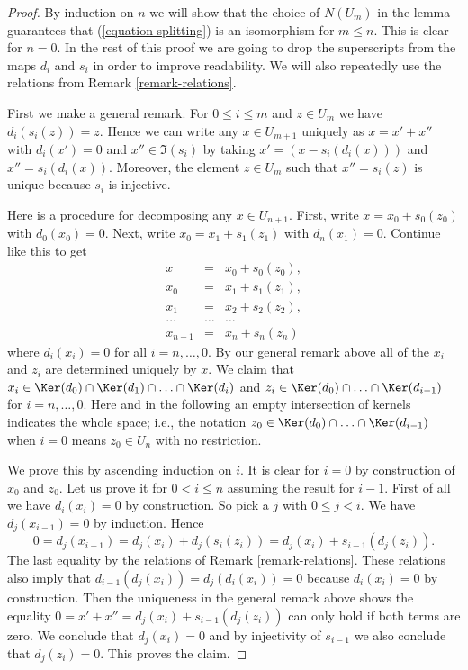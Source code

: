 \begin{proof}
By induction on $n$ we will show that the choice of $N(U_m)$
in the lemma guarantees that (\ref{equation-splitting}) is
an isomorphism for $m \leq n$. This is clear for $n = 0$.
In the rest of this proof we are going to
drop the superscripts from the maps $d_i$ and $s_i$ in order
to improve readability. We will also repeatedly use the relations
from Remark \ref{remark-relations}.

\medskip\noindent
First we make a general remark.
For $0 \leq i \leq m$ and $z \in U_m$ we have
$d_i(s_i(z)) = z$. Hence we can write
any $x \in U_{m + 1}$ uniquely as
$x = x' + x''$ with $d_i(x') = 0$
and $x'' \in \Im(s_i)$
by taking $x' = (x - s_i(d_i(x)))$ and
$x'' = s_i(d_i(x))$. Moreover, the element
$z \in U_m$ such that $x'' = s_i(z)$
is unique because $s_i$ is injective.

\medskip\noindent
Here is a procedure for decomposing
any $x \in U_{n + 1}$.
First, write $x = x_0 + s_0(z_0)$ with $d_0(x_0) = 0$.
Next, write $x_0 = x_1 + s_1(z_1)$ with
$d_n(x_1) = 0$. Continue like this to get
\begin{eqnarray*}
x & = & x_0 + s_0(z_0), \\
x_0 & = & x_1 + s_1(z_1), \\
x_1 & = & x_2 + s_2(z_2), \\
\ldots & \ldots & \ldots \\
x_{n - 1} & = & x_n + s_n(z_n)
\end{eqnarray*}
where $d_i(x_i) = 0$ for all $i = n, \ldots, 0$.
By our general remark above all of the $x_i$
and $z_i$ are determined uniquely by $x$.
We claim that
$x_i \in
\Ker(d_0) \cap
\Ker(d_1) \cap
\ldots \cap
\Ker(d_i)$
and
$z_i \in
\Ker(d_0) \cap
\ldots \cap
\Ker(d_{i - 1})$
for $i = n, \ldots, 0$.
Here and in the following
an empty intersection of kernels indicates
the whole space; i.e.,
the notation
$z_0 \in \Ker(d_0) \cap
\ldots \cap
\Ker(d_{i - 1})$
when $i = 0$ means $z_0 \in U_n$ with no restriction.

\medskip\noindent
We prove this by ascending induction on $i$.
It is clear for $i = 0$ by construction of $x_0$ and $z_0$.
Let us prove it for $0 < i \leq n$ assuming the result for $i - 1$.
First of all we have $d_i(x_i) = 0$ by construction.
So pick a $j$ with $0 \leq j < i$. We have
$d_j(x_{i - 1}) = 0$ by induction. Hence
$$
0 = d_j(x_{i - 1})
= d_j(x_i) + d_j(s_i(z_i))
= d_j(x_i) + s_{i - 1}(d_j(z_i)).
$$
The last equality by the relations of Remark \ref{remark-relations}.
These relations also imply that
$d_{i - 1}(d_j(x_i)) = d_j(d_i(x_i)) = 0$
because $d_i(x_i)= 0$ by construction.
Then the uniqueness in the general remark above shows the equality
$0 = x' + x'' = d_j(x_i) + s_{i - 1}(d_j(z_i))$
can only hold if both terms are zero. We conclude that
$d_j(x_i) = 0$ and by injectivity of $s_{i - 1}$ we also
conclude that $d_j(z_i) = 0$. This proves the claim.


\end{proof}
